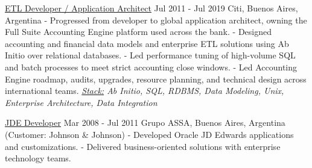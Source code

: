 \documentclass[a4paper]{ThirtyNinesecondscv}
\begin{document}
\begin{minipage}{\linewidth}
{\large\underline{ETL Developer / Application Architect}}  \hspace*{22pt} Jul 2011 - Jul 2019
\newline
Citi, Buenos Aires, Argentina
\newline- Progressed from developer to global application architect, owning the Full Suite Accounting Engine platform used across the bank.
\newline- Designed accounting and financial data models and enterprise ETL solutions using Ab Initio over relational databases.
\newline- Led performance tuning of high-volume SQL and batch processes to meet strict accounting close windows.
\newline- Led Accounting Engine roadmap, audits, upgrades, resource planning, and technical design across international teams.
\newline\textit{\underline{Stack:} Ab Initio, SQL, RDBMS, Data Modeling, Unix, Enterprise Architecture, Data Integration}
\end{minipage}
\par\vspace{6pt}

\begin{minipage}{\linewidth}
{\large\underline{JDE Developer}}  \hspace*{22pt} Mar 2008 - Jul 2011
\newline
Grupo ASSA, Buenos Aires, Argentina (Customer: Johnson \& Johnson)
\newline- Developed Oracle JD Edwards applications and customizations.
\newline- Delivered business-oriented solutions with enterprise technology teams.
\end{minipage}
\par\vspace{6pt}
\end{document}
